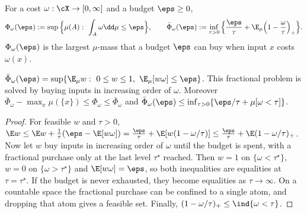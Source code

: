 \begin{definition}\label{def:knapsack}
For a cost $\omega:\cX\to[0,\infty]$ and a budget $\eps\ge0$,
\[
\Phi_\omega(\eps):=\sup\Big\{\mu(A):\ \int_A\omega\dd\mu\le\eps\Big\},\qquad
\bar\Phi_\omega(\eps):=\inf_{\tau>0}\Big\{\frac\eps\tau+\E_\mu\Big(1-\frac\omega\tau\Big)_+\Big\}.
\]
$\Phi_\omega(\eps)$ is the largest $\mu$-mass that a budget $\eps$ can buy when input $x$ costs $\omega(x)$.
\end{definition}

\begin{lemma}\label{lem:knapsack}
\Pv\Ck $\bar\Phi_\omega(\eps)=\sup\{\E_\mu w:\ 0\le w\le1,\ \E_\mu[w\omega]\le\eps\}$. This fractional problem is
solved by buying inputs in increasing order of $\omega$. Moreover
$\bar\Phi_\omega-\max_x\mu(\{x\})\le\Phi_\omega\le\bar\Phi_\omega$ and
$\bar\Phi_\omega(\eps)\le\inf_{\tau>0}\{\eps/\tau+\mu[\omega<\tau]\}$.
\end{lemma}
\begin{proof}
For feasible $w$ and $\tau>0$,
$\E w\le\E w+\frac1\tau(\eps-\E[w\omega])=\frac\eps\tau+\E[w(1-\omega/\tau)]\le\frac\eps\tau+\E(1-\omega/\tau)_+$.
Now let $w$ buy inputs in increasing order of $\omega$ until the budget is spent, with a fractional purchase
only at the last level $\tau^\star$ reached. Then $w=1$ on $\{\omega<\tau^\star\}$, $w=0$ on $\{\omega>\tau^\star\}$ and
$\E[w\omega]=\eps$, so both inequalities are equalities at $\tau=\tau^\star$. If the budget is never exhausted,
they become equalities as $\tau\to\infty$. On a countable space the fractional purchase can be confined to a
single atom, and dropping that atom gives a feasible set. Finally,
$(1-\omega/\tau)_+\le\ind\{\omega<\tau\}$.
\end{proof}

